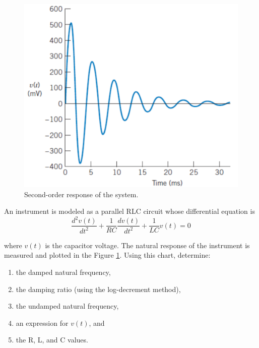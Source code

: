 \documentclass[a4paper,11pt]{book}
\begin{document}
\begin{question}[subtitle=Midterm 2017]
\begin{figure}[h!]\label{fig:problem1}
\centering
  \includegraphics[width=0.7\linewidth]{problem1}
  \caption{Second-order response of the system.} 
\end{figure}
An instrument is modeled as a parallel RLC circuit whose differential equation is 
\begin{equation*}
\frac{d^2 v(t)}{dt^2} + \frac{1}{RC}\frac{dv(t)}{dt^2} + \frac{1}{LC}v(t) = 0
\end{equation*}

where $v(t)$ is the capacitor voltage.
The natural response of the instrument is measured
and plotted in the Figure \ref{fig:problem1}. Using this chart, determine:
\begin{enumerate}
\item the damped natural frequency,
\item the damping ratio (using the log-decrement method),
\item the undamped natural frequency,
\item an expression for $v(t)$, and
\item the R, L, and C values.
\end{enumerate}

\examspace*{50em}

\end{question}
\begin{solution}
\end{solution}
\end{document}
